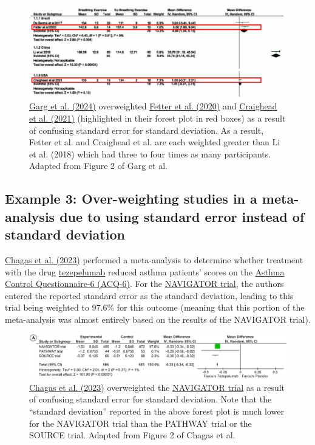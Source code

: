 \documentclass[letterpaper, 12pt]{article}
\begin{document}
\begin{figure}[h!tbp]
    \includegraphics[width=\textwidth]{img/sd_vs_se/garg_problem.png}
    \caption*{\href{https://doi.org/10.1016/j.ijcrp.2023.200232}{Garg et al. (2024)} overweighted \href{https://doi.org/10.3389/fphys.2020.00898}{Fetter et al. (2020)} and \href{https://doi.org/10.1161/JAHA.121.020980}{Craighead et al. (2021)} (highlighted in their forest plot in red boxes) as a result of confusing standard error for standard deviation. As a result, Fetter et al. and Craighead et al. are each weighted greater than Li et al. (2018) which had three to four times as many participants. Adapted from Figure 2 of Garg et al.}
\end{figure}

\subsection*{Example 3: Over-weighting studies in a meta-analysis due to using standard error instead of standard deviation}

\href{https://doi.org/10.1007/s11882-023-01085-y}{Chagas et al. (2023)} performed a meta-analysis to determine whether treatment with the drug \href{https://en.wikipedia.org/wiki/Tezepelumab}{tezepelumab} reduced asthma patients' scores on the \href{http://www.qoltech.co.uk/acq.html}{Asthma Control Questionnaire-6 (ACQ-6)}. For the \href{https://doi.org/10.1056/NEJMoa2034975}{NAVIGATOR trial}, the authors entered the reported standard error as the standard deviation, leading to this trial being weighted to 97.6\% for this outcome (meaning that this portion of the meta-analysis was almost entirely based on the results of the NAVIGATOR trial).

\begin{figure}[h!tbp]
    \includegraphics[width=\textwidth]{img/sd_vs_se/chagas_problem.png}
    \caption*{\href{https://doi.org/10.1007/s11882-023-01085-y}{Chagas et al. (2023)} overweighted the \href{https://doi.org/10.1056/NEJMoa2034975}{NAVIGATOR trial} as a result of confusing standard error for standard deviation. Note that the ``standard deviation'' reported in the above forest plot is much lower for the NAVIGATOR trial than the PATHWAY trial or the SOURCE trial. Adapted from Figure 2 of Chagas et al.}
\end{figure}
\end{document}
